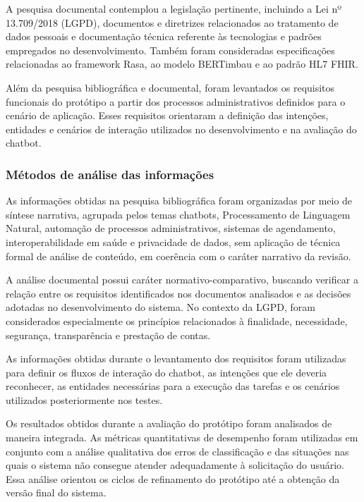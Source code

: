 \documentclass[12pt,a4paper]{extarticle}
\begin{document}
A pesquisa documental contemplou a legislação pertinente, incluindo a Lei nº 13.709/2018 (LGPD), documentos e diretrizes relacionados ao tratamento de dados pessoais e documentação técnica referente às tecnologias e padrões empregados no desenvolvimento. Também foram consideradas especificações relacionadas ao framework Rasa, ao modelo BERTimbau e ao padrão HL7 FHIR.

Além da pesquisa bibliográfica e documental, foram levantados os requisitos funcionais do protótipo a partir dos processos administrativos definidos para o cenário de aplicação. Esses requisitos orientaram a definição das intenções, entidades e cenários de interação utilizados no desenvolvimento e na avaliação do chatbot.

\subsubsection{Métodos de análise das informações}

As informações obtidas na pesquisa bibliográfica foram organizadas por meio de síntese narrativa, agrupada pelos temas chatbots, Processamento de Linguagem Natural, automação de processos administrativos, sistemas de agendamento, interoperabilidade em saúde e privacidade de dados, sem aplicação de técnica formal de análise de conteúdo, em coerência com o caráter narrativo da revisão.

A análise documental possui caráter normativo-comparativo, buscando verificar a relação entre os requisitos identificados nos documentos analisados e as decisões adotadas no desenvolvimento do sistema. No contexto da LGPD, foram considerados especialmente os princípios relacionados à finalidade, necessidade, segurança, transparência e prestação de contas.

As informações obtidas durante o levantamento dos requisitos foram utilizadas para definir os fluxos de interação do chatbot, as intenções que ele deveria reconhecer, as entidades necessárias para a execução das tarefas e os cenários utilizados posteriormente nos testes.

Os resultados obtidos durante a avaliação do protótipo foram analisados de maneira integrada. As métricas quantitativas de desempenho foram utilizadas em conjunto com a análise qualitativa dos erros de classificação e das situações nas quais o sistema não consegue atender adequadamente à solicitação do usuário. Essa análise orientou os ciclos de refinamento do protótipo até a obtenção da versão final do sistema.
\end{document}
